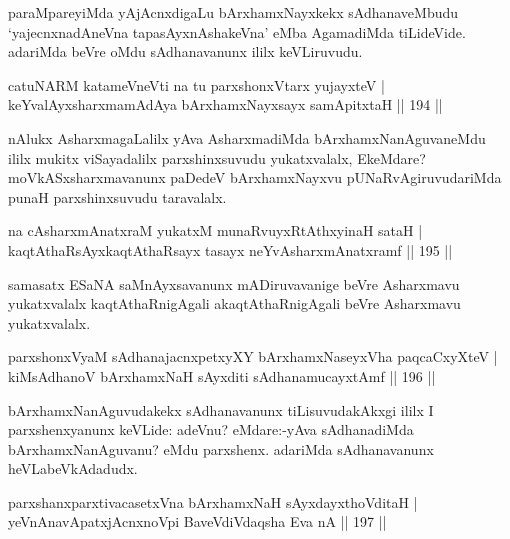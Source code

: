 \begin{artha}
paraMpareyiMda yAjAcnxdigaLu bArxhamxNayxkekx sAdhanaveMbudu `yajecnxnadAneVna tapasAyxnAshakeVna' eMba AgamadiMda tiLideVide. adariMda beVre oMdu sAdhanavanunx ililx keVLiruvudu.
\end{artha}

\begin{shl}
catuNARM katameVneVti na tu parxshonxV\s tarx yujayxteV |\\
keYvalAyxsharxmamAdAya bArxhamxNayxsayx samApitxtaH \hfill || 194 ||
\end{shl}

\begin{artha}
nAlukx AsharxmagaLalilx yAva AsharxmadiMda bArxhamxNanAguvaneMdu ililx mukitx viSayadalilx parxshinxsuvudu yukatxvalalx, EkeMdare? moVkASxsharxmavanunx paDedeV bArxhamxNayxvu pUNaRvAgiruvudariMda punaH parxshinxsuvudu taravalalx.
\end{artha}

\begin{shl}
na cA\s \s sharxmAnatxraM yukatxM munaRvuyxRtAthxyinaH sataH |\\
kaqtAthaRsAyxkaqtAthaRsayx tasayx neYvA\s \s sharxmAnatxramf \hfill || 195 ||
\end{shl}

\begin{artha}%
samasatx ESaNA saMnAyxsavanunx mADiruvavanige beVre Asharxmavu yukatxvalalx kaqtAthaRnigAgali akaqtAthaRnigAgali beVre Asharxmavu yukatxvalalx.
\end{artha}

\begin{shl}
parxshonxV\s yaM sAdhanajacnxpetxyXY bArxhamxNaseyxVha paqcaCxyXteV  |\\
kiMsAdhanoV bArxhamxNaH sAyxditi sAdhanamucayxtAmf \hfill || 196 ||
\end{shl}

\begin{artha}
bArxhamxNanAguvudakekx sAdhanavanunx tiLisuvudakAkxgi ililx I parxshenxyanunx keVLide: adeVnu? eMdare:-yAva sAdhanadiMda bArxhamxNanAguvanu? eMdu parxshenx. adariMda sAdhanavanunx heVLabeVkAdadudx.
\end{artha}

\begin{shl}
parxshanxparxtivacasetxVna bArxhamxNaH sAyxdayxthoVditaH |\\
yeVnAnavApatxjAcnxnoV\s pi BaveVdiVdaqsha Eva nA \hfill || 197 ||
\end{shl}


